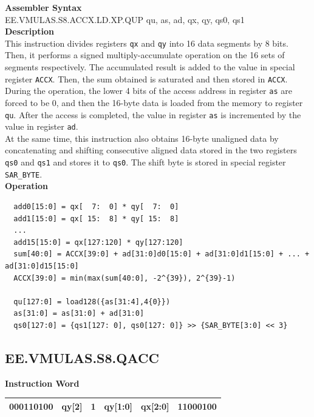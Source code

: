 \textbf{Assembler Syntax} \\
EE.VMULAS.S8.ACCX.LD.XP.QUP qu, as, ad, qx, qy, qs0, qs1 \\
\textbf{Description} \\
This instruction divides registers \lstinline{qx} and \lstinline{qy} into 16 data segments by 8 bits. Then, it performs a signed multiply-accumulate operation on the 16 sets of segments respectively. The accumulated result is added to the value in special register \lstinline{ACCX}. Then, the sum obtained is saturated and then stored in \lstinline{ACCX}.\\
During the operation, the lower 4 bits of the access address in register \lstinline{as} are forced to be 0, and then the 16-byte data is loaded from the memory to register \lstinline{qu}. After the access is completed, the value in register \lstinline{as} is incremented by the value in register \lstinline{ad}.\\
At the same time, this instruction also obtains 16-byte unaligned data by concatenating and shifting consecutive aligned data stored in the two registers \lstinline{qs0} and \lstinline{qs1} and stores it to \lstinline{qs0}. The shift byte is stored in special register \lstinline{SAR_BYTE}.\\
\textbf{Operation}
\begin{lstlisting}
  add0[15:0] = qx[  7:  0] * qy[  7:  0]
  add1[15:0] = qx[ 15:  8] * qy[ 15:  8]
  ...
  add15[15:0] = qx[127:120] * qy[127:120]
  sum[40:0] = ACCX[39:0] + ad[31:0]d0[15:0] + ad[31:0]d1[15:0] + ... + ad[31:0]d15[15:0]
  ACCX[39:0] = min(max(sum[40:0], -2^{39}), 2^{39}-1)

  qu[127:0] = load128({as[31:4],4{0}})
  as[31:0] = as[31:0] + ad[31:0]
  qs0[127:0] = {qs1[127: 0], qs0[127: 0]} >> {SAR_BYTE[3:0] << 3}
\end{lstlisting}

\clearpage
\subsection{EE.VMULAS.S8.QACC}\label{instruction:EEVMULASS8QACC}
\setlength\tabcolsep{6pt}
\textbf{Instruction Word} \\
\begin{tabular}{|c|c|c|c|c|c|}
	\hline
	000110100 & qy[2] & 1 & qy[1:0] & qx[2:0] & 11000100 \\
	\hline
\end{tabular}

